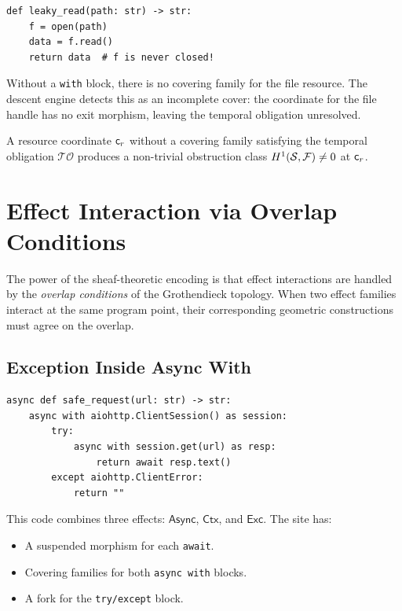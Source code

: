 \documentclass[11pt]{article}
\newcommand{\Sect}{\mathcal{F}}          %
\newcommand{\Exc}{\mathsf{Exc}}          %
\newcommand{\Async}{\mathsf{Async}}      %
\newcommand{\Ctx}{\mathsf{Ctx}}          %
\newcommand{\tempoblig}{\mathcal{T\!O}}  %
\begin{document}
\begin{lstlisting}[style=jugeo-python,caption={Resource leak: open without close.}]
def leaky_read(path: str) -> str:
    f = open(path)
    data = f.read()
    return data  # f is never closed!
\end{lstlisting}

Without a \texttt{with} block, there is no covering family for the
file resource.  The descent engine detects this as an incomplete cover:
the coordinate for the file handle has no exit morphism, leaving the
temporal obligation unresolved.

\begin{proposition}\label{prop:leak}
A resource coordinate $\mathsf{c}_r$ without a covering family satisfying
the temporal obligation $\tempoblig$ produces a non-trivial
obstruction class $\Hcoh{1}(\Site, \Sect) \neq 0$ at $\mathsf{c}_r$.
\end{proposition}

\section{Effect Interaction via Overlap Conditions}\label{sec:interactions}

The power of the sheaf-theoretic encoding is that effect interactions
are handled by the \emph{overlap conditions} of the Grothendieck
topology.  When two effect families interact at the same program point,
their corresponding geometric constructions must agree on the overlap.

\subsection{Exception Inside Async With}

\begin{lstlisting}[style=jugeo-python,caption={Exception inside async context manager.}]
async def safe_request(url: str) -> str:
    async with aiohttp.ClientSession() as session:
        try:
            async with session.get(url) as resp:
                return await resp.text()
        except aiohttp.ClientError:
            return ""
\end{lstlisting}

This code combines three effects: $\Async$, $\Ctx$, and $\Exc$.
The site has:
\begin{itemize}[nosep]
\item A suspended morphism for each \texttt{await}.
\item Covering families for both \texttt{async with} blocks.
\item A fork for the \texttt{try/except} block.
\end{itemize}
\end{document}
